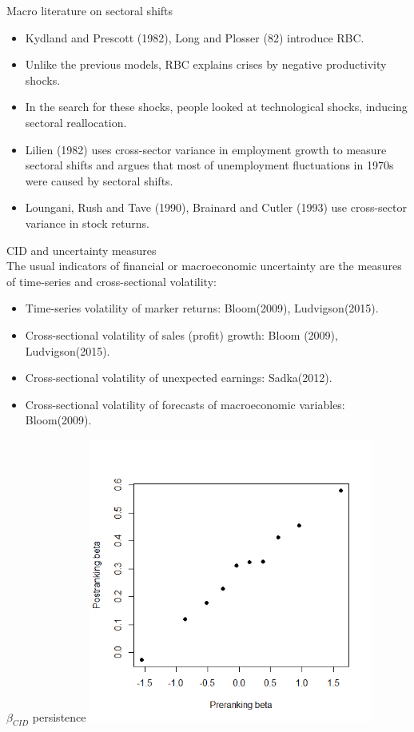 \documentclass{beamer}
\begin{document}
\begin{frame}{Macro literature on sectoral shifts}
\begin{itemize}
    \item {Kydland and Prescott (1982), Long and Plosser (82) introduce RBC.}
    \item {Unlike the previous models, RBC explains crises by negative productivity shocks.}
    \item {In the search for these shocks, people looked at technological shocks, inducing sectoral reallocation.}
    \item {Lilien (1982) uses cross-sector variance in employment growth to measure sectoral shifts and argues that most of unemployment fluctuations in 1970s were caused by sectoral shifts.}
    \item {Loungani, Rush and Tave (1990), Brainard and Cutler (1993) use cross-sector variance in stock returns.}
\end{itemize}
\end{frame}


\begin{frame}{CID and uncertainty measures} \\
{The usual indicators of financial or macroeconomic uncertainty are the measures of time-series and cross-sectional volatility:}
\begin{itemize}
    \item {Time-series volatility of marker returns: Bloom(2009), Ludvigson(2015).}
    \item {Cross-sectional volatility of sales (profit) growth: Bloom (2009), Ludvigson(2015).}
    \item {Cross-sectional volatility of unexpected earnings: Sadka(2012).}
    \item {Cross-sectional volatility of forecasts of macroeconomic variables: Bloom(2009).}
\end{itemize}
\end{frame}


\begin{frame}{$\beta_{CID}$ persistence}
\includegraphics[width=0.70\textwidth]{Figure2.png}
\end{frame}
\end{document}
